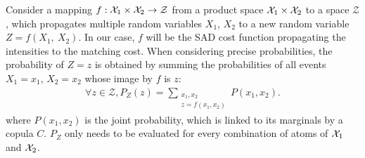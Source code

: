 Consider a mapping $f:{\mathcal{X}}_1\times{\mathcal{X}}_2\rightarrow\mathcal{Z}$ from a product space ${\mathcal{X}}_1\times{\mathcal{X}}_2$ to a space $\mathcal{Z}$, which propagates multiple random variables $X_1$, $X_2$ to a new random variable $Z=f(X_1, ~X_2)$. In our case, $f$ will be the SAD cost function propagating the intensities to the matching cost. When considering precise probabilities, the probability of $Z=z$ is obtained by summing the probabilities of all events $X_1=x_1$, $X_2=x_2$ whose image by $f$ is $z$: 
\begin{align}\label{eq:precise_propagate_proba}
    \forall z\in\mathcal{Z}, P_Z(z)=\sum_{\substack{x_1,x_2\\z=f(x_1,x_2)}}P(x_1,x_2).
\end{align}
where $P(x_1,x_2)$ is the joint probability, which is linked to its marginals by a copula $C$. $P_Z$ only needs to be evaluated for every combination of atoms of ${\mathcal{X}}_1$ and ${\mathcal{X}}_2$.

